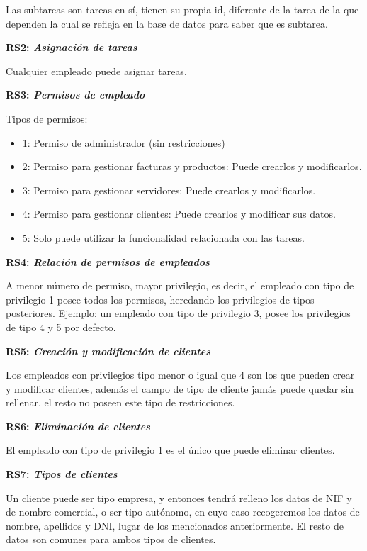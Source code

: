 \documentclass[paper=a4, fontsize=11pt, spanish]{scrartcl}
\begin{document}
Las subtareas son tareas en sí, tienen su propia id, diferente de la tarea de la que dependen la cual se refleja en la base de datos para saber que es subtarea.

\setlength{\parindent}{0em}
\textbf{RS2: \textit{Asignación de tareas}}
\setlength{\parindent}{2em}

Cualquier empleado puede asignar tareas.

\setlength{\parindent}{0em}
\textbf{RS3: \textit{Permisos de empleado}}
\setlength{\parindent}{2em}

Tipos de permisos:
\begin{itemize}
\item 1: Permiso de administrador (sin restricciones)
\item 2: Permiso para gestionar facturas y productos: Puede crearlos y modificarlos.
\item 3: Permiso para gestionar servidores: Puede crearlos y modificarlos.
\item 4: Permiso para gestionar clientes: Puede crearlos y modificar sus datos.
\item 5: Solo puede utilizar la funcionalidad relacionada con las tareas.
\end{itemize}

\setlength{\parindent}{0em}
\textbf{RS4: \textit{Relación de permisos de empleados}}
\setlength{\parindent}{2em}

A menor número de permiso, mayor privilegio, es decir, el empleado con tipo de privilegio 1 posee todos los permisos, heredando los privilegios de tipos posteriores.
Ejemplo: un empleado con tipo de privilegio 3, posee los privilegios de tipo 4 y 5 por defecto.

\setlength{\parindent}{0em}
\textbf{RS5: \textit{Creación y modificación de clientes}}
\setlength{\parindent}{2em}

Los empleados con privilegios tipo menor o igual que 4 son los que pueden crear y modificar clientes, además el campo de tipo de cliente jamás puede quedar sin rellenar, el resto no poseen este tipo de restricciones.


\setlength{\parindent}{0em}
\textbf{RS6: \textit{Eliminación de clientes}}
\setlength{\parindent}{2em}

El empleado con tipo de privilegio 1 es el único que puede eliminar clientes.

\setlength{\parindent}{0em}
\textbf{RS7: \textit{Tipos de clientes}}
\setlength{\parindent}{2em}

Un cliente puede ser tipo empresa, y entonces tendrá relleno los datos de NIF y de nombre comercial, o ser tipo autónomo, en cuyo caso recogeremos los datos de nombre, apellidos y DNI, lugar de los mencionados anteriormente. El resto de datos son comunes para ambos tipos de clientes.
\end{document}
